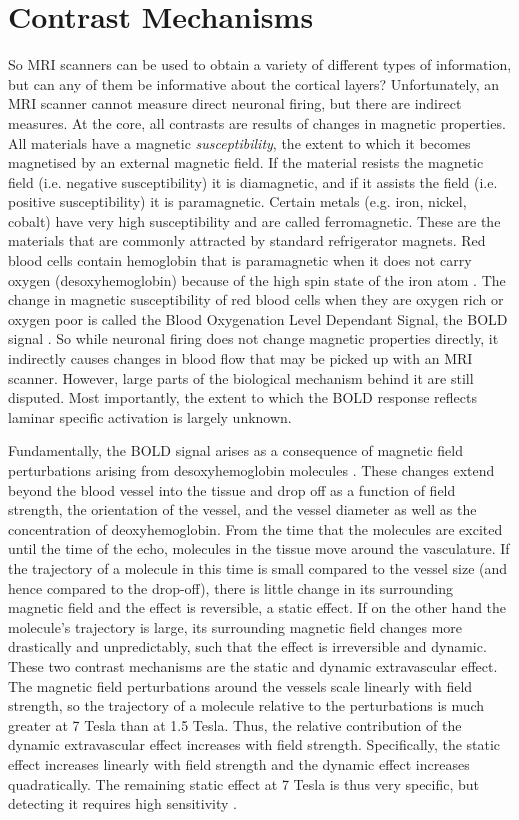 \section*{Contrast Mechanisms}
So MRI scanners can be used to obtain a variety of different types of information, but can any of them be informative about the cortical layers? Unfortunately, an MRI scanner cannot measure direct neuronal firing, but there are indirect measures. At the core, all contrasts are results of changes in magnetic properties. All materials have a magnetic \emph{susceptibility}, the extent to which it becomes magnetised by an external magnetic field. If the material resists the magnetic field (i.e. negative susceptibility) it is diamagnetic, and if it assists the field (i.e. positive susceptibility) it is paramagnetic. Certain metals (e.g. iron, nickel, cobalt) have very high susceptibility and are called ferromagnetic. These are the materials that are commonly attracted by standard refrigerator magnets. Red blood cells contain hemoglobin that is paramagnetic when it does not carry oxygen (desoxyhemoglobin) because of the high spin state of the iron atom \cite{Pauling1936}. The change in magnetic susceptibility of red blood cells when they are oxygen rich or oxygen poor is called the Blood Oxygenation Level Dependant Signal, the BOLD signal \cite{Ogawa1990}. So while neuronal firing does not change magnetic properties directly, it indirectly causes changes in blood flow that may be picked up with an MRI scanner. However, large parts of the biological mechanism behind it are still disputed. Most importantly, the extent to which the BOLD response reflects laminar specific activation is largely unknown.

Fundamentally, the BOLD signal arises as a consequence of magnetic field perturbations arising from desoxyhemoglobin molecules \cite{Norris2006}. These changes extend beyond the blood vessel into the tissue and drop off as a function of field strength, the orientation of the vessel, and the vessel diameter as well as the concentration of deoxyhemoglobin. From the time that the molecules are excited until the time of the echo, molecules in the tissue move around the vasculature. If the trajectory of a molecule in this time is small compared to the vessel size (and hence compared to the drop-off), there is little change in its surrounding magnetic field and the effect is reversible, a static effect. If on the other hand the molecule's trajectory is large, its surrounding magnetic field changes more drastically and unpredictably, such that the effect is irreversible and dynamic. These two contrast mechanisms are the static and dynamic extravascular effect. The magnetic field perturbations around the vessels scale linearly with field strength, so the trajectory of a molecule relative to the perturbations is much greater at 7 Tesla than at 1.5 Tesla. Thus, the relative contribution of the dynamic extravascular effect increases with field strength. Specifically, the static effect increases linearly with field strength and the dynamic effect increases quadratically. The remaining static effect at 7 Tesla is thus very specific, but detecting it requires high sensitivity \cite{Panchuelo2014}.

